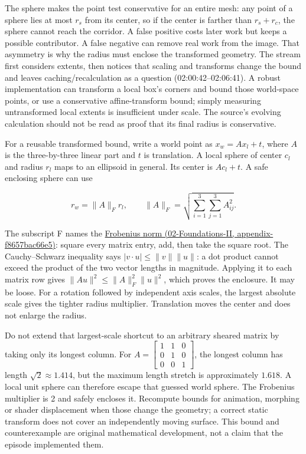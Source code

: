 The sphere makes the point test conservative for an entire mesh: any point of a sphere lies at most \(r_s\) from its center, so if the center is farther than \(r_s+r_c\), the sphere cannot reach the corridor. A false positive costs later work but keeps a possible contributor. A false negative can remove real work from the image. That asymmetry is why the radius must enclose the transformed geometry. The stream first considers extents, then notices that scaling and transforms change the bound and leaves caching/recalculation as a question (02:00:42--02:06:41). A robust implementation can transform a local box's corners and bound those world-space points, or use a conservative affine-transform bound; simply measuring untransformed local extents is insufficient under scale. The source's evolving calculation should not be read as proof that its final radius is conservative.

For a reusable transformed bound, write a world point as \(x_w=A x_l+t\), where \(A\) is the three-by-three linear part and \(t\) is translation. A local sphere of center \(c_l\) and radius \(r_l\) maps to an ellipsoid in general. Its center is \(A c_l+t\). A safe enclosing sphere can use

\[
r_w=\|A\|_F r_l,\qquad
\|A\|_F=\sqrt{\sum_{i=1}^3\sum_{j=1}^3 A_{ij}^2}.
\]

The subscript F names the \href{../02-Foundations-II/main.pdf\#nameddest=appendix-f8657bac66e5}{Frobenius norm (02-Foundations-II, appendix-f8657bac66e5)}: square every matrix entry, add, then take the square root. The Cauchy--Schwarz inequality says \(|v\cdot u|\leq\|v\|\|u\|\): a dot product cannot exceed the product of the two vector lengths in magnitude. Applying it to each matrix row gives \(\|Au\|^2\leq\|A\|_F^2\|u\|^2\), which proves the enclosure. It may be loose. For a rotation followed by independent axis scales, the largest absolute scale gives the tighter radius multiplier. Translation moves the center and does not enlarge the radius.

Do not extend that largest-scale shortcut to an arbitrary sheared matrix by taking only its longest column. For \(A=\begin{bmatrix}1&1&0\\0&1&0\\0&0&1\end{bmatrix}\), the longest column has length \(\sqrt2\approx1.414\), but the maximum length stretch is approximately \(1.618\). A local unit sphere can therefore escape that guessed world sphere. The Frobenius multiplier is 2 and safely encloses it. Recompute bounds for animation, morphing or shader displacement when those change the geometry; a correct static transform does not cover an independently moving surface. This bound and counterexample are original mathematical development, not a claim that the episode implemented them.

